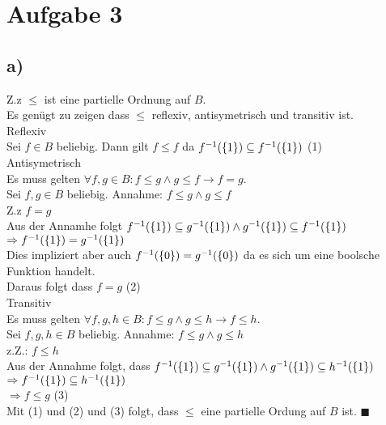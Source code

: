\section*{Aufgabe 3}
\subsection*{a)}

Z.z $\leq$ ist eine partielle Ordnung auf $B$.\\
Es genügt zu zeigen dass $\leq$ reflexiv, antisymetrisch und transitiv ist.\\

Reflexiv\\
Sei $f \in B$ beliebig. Dann gilt $f \leq f$ da $f^{-1}(\{1\}) \subseteq f^{-1}(\{1\})$ (1)\\

Antisymetrisch \\
Es muss gelten $\forall f,g \in B : f \leq g \land g \leq f \rightarrow f =g$.\\
Sei $f,g \in B$ beliebig. 
Annahme: $f \leq g \land g \leq f $ \\
Z.z $f =g$\\
Aus der Annamhe folgt $f^{-1}(\{1\}) \subseteq g^{-1}(\{1\}) \land g^{-1}(\{1\}) \subseteq f^{-1}(\{1\}) $\\
 $\Rightarrow f^{-1}(\{1\}) = g^{-1}(\{1\})$\\
Dies impliziert aber auch $f^{-1}(\{0\}) = g^{-1}(\{0\})$ da es sich um eine boolsche Funktion handelt.\\
Daraus folgt dass $f=g$ (2)\\

Transitiv\\
Es muss gelten $\forall f,g,h \in B : f \leq g \land g \leq h \rightarrow f \leq h$.\\
Sei $f,g,h \in B$ beliebig. 
Annahme: $f \leq g \land g \leq h$\\
z.Z.: $f \leq h$\\
Aus der Annahme folgt, dass  $f^{-1}(\{1\}) \subseteq g^{-1}(\{1\}) \land g^{-1}(\{1\}) \subseteq h^{-1}(\{1\})$\\
$\Rightarrow f^{-1}(\{1\}) \subseteq h^{-1}(\{1\})$\\
$\Rightarrow f \leq g$ (3)\\

Mit (1) und (2) und (3) folgt, dass $\leq$ eine partielle Ordung auf $B$ ist. $\blacksquare$